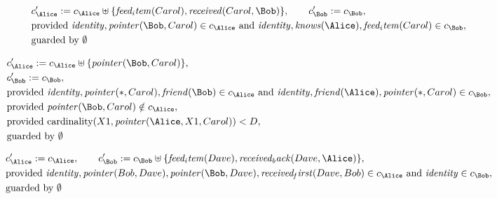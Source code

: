 \begin{align*}
&
c'_
{
\Alice
}
 := 
c_
{
\Alice
}
 \uplus 
\{
\mathit{
feed_item
}
(
Carol
)
,
\mathit{
received
}
(
Carol
,
\Bob
)
\}
, \qquad 
c'_
{
\Bob
}
 := 
c_
{
\Bob
}
,\\
&
\text{provided } 
\mathit{
identity
}
,
\mathit{
pointer
}
(
\Bob
,
Carol
)
 \in c_
{
\Alice
}
 \text{ and } 
\mathit{
identity
}
,
\mathit{
knows
}
(
\Alice
)
,
\mathit{
feed_item
}
(
Carol
)
 \in c_
{
\Bob
}
,\\
&
\text{guarded by } \emptyset
\end{align*}

\begin{align*}
&
c'_
{
\Alice
}
 := 
c_
{
\Alice
}
 \uplus 
\{
\mathit{
pointer
}
(
\Bob
,
Carol
)
\}
,\\
&
c'_
{
\Bob
}
 := 
c_
{
\Bob
}
,\\
&
\text{provided } 
\mathit{
identity
}
,
\mathit{
pointer
}
(
\ast
,
Carol
)
,
\mathit{
friend
}
(
\Bob
)
 \in c_
{
\Alice
}
 \text{ and } 
\mathit{
identity
}
,
\mathit{
friend
}
(
\Alice
)
,
\mathit{
pointer
}
(
\ast
,
Carol
)
 \in c_
{
\Bob
}
,\\
&
\text{provided } 
\mathit{
pointer
}
(
\Bob
,
Carol
)
 \notin c_
{
\Alice
}
,\\
&
\text{provided } 
\mathrm{cardinality}(
X1
,
\mathit{
pointer
}
(
\Alice
,
X1
,
Carol
)
)
<
D
,\\
&
\text{guarded by } \emptyset
\end{align*}

\begin{align*}
&
c'_
{
\Alice
}
 := 
c_
{
\Alice
}
, \qquad 
c'_
{
\Bob
}
 := 
c_
{
\Bob
}
 \uplus 
\{
\mathit{
feed_item
}
(
Dave
)
,
\mathit{
received_back
}
(
Dave
,
\Alice
)
\}
,\\
&
\text{provided } 
\mathit{
identity
}
,
\mathit{
pointer
}
(
Bob
,
Dave
)
,
\mathit{
pointer
}
(
\Bob
,
Dave
)
,
\mathit{
received_first
}
(
Dave
,
Bob
)
 \in c_
{
\Alice
}
 \text{ and } 
\mathit{
identity
}
 \in c_
{
\Bob
}
,\\
&
\text{guarded by } \emptyset
\end{align*}
